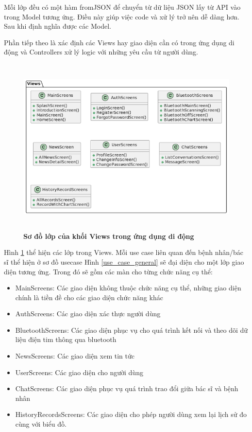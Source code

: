 \begin{enumerate}[a)]
  Mỗi lớp đều có một hàm fromJSON để chuyển từ dữ liệu JSON lấy từ API vào trong Model tương ứng. Điều này giúp
  việc code và xử lý trở nên dễ dàng hơn. Sau khi định nghĩa được các Model.
  
  Phần tiếp theo là xác định các Views hay giao diện cần có trong ứng dụng di động và Controllers xử lý logic với những
  yêu cầu từ người dùng.

  \begin{figure}[H]
    \centering
    \includegraphics[width=14cm,height=9cm]{Images/mobile_app/class_diagram/mobile_class_view.png}
    \caption[Sơ đồ lớp của khối Views trong ứng dụng di động]{\bfseries \fontsize{12pt}{0pt}\selectfont Sơ đồ lớp của khối Views trong ứng dụng di động}
    \label{mobile_class_view} %
  \end{figure}

  Hình \ref{mobile_class_view} thể hiện các lớp trong Views. Mỗi use case liên quan đến bệnh nhân/bác sĩ thể hiện ở sơ đồ 
  usecase Hình \ref{use_case_general} sẽ đại diện cho một lớp giao diện tương ứng. Trong đó sẽ gồm các màn cho từng chức năng
  cụ thể:

  \begin{itemize}
    \item MainScreens: Các giao diện không thuộc chức năng cụ thể, những giao diện chính là tiền đề cho các giao diện chức năng khác
    \item AuthScreens: Các giao diện xác thực người dùng 
    \item BluetoothScreens: Các giao diện phục vụ cho quá trình kết nối và theo dõi dữ liệu điện tim thông qua bluetooth
    \item NewsScreens: Các giao diện xem tin tức
    \item UserScreens: Các giao diện cho người dùng
    \item ChatScreens: Các giao diện phục vụ quá trình trao đổi giữa bác sĩ và bệnh nhân
    \item HistoryRecordsScreens: Các giao diện cho phép người dùng xem lại lịch sử đo cùng với biểu đồ. 
  \end{itemize}
  

\end{enumerate}

